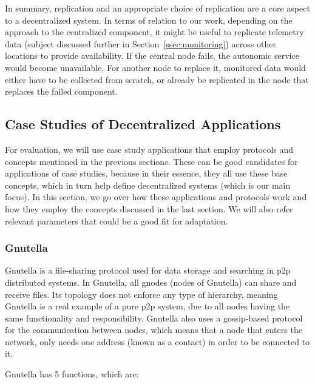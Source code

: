 \par In summary, replication and an appropriate choice of replication are a core aspect to a decentralized system. In terms of relation to our work, depending on the approach to the centralized component, it might be useful to replicate telemetry data (subject discussed further in Section~\ref{ssec:monitoring}) across other locations to provide availability. If the central node fails, the autonomic service would become unavailable. For another node to replace it, monitored data would either have to be collected from scratch, or already be replicated in the node that replaces the failed component.%
%
%
%
\subsection{Case Studies of Decentralized Applications}
\label{ssec:study_cases_of_decentralized_systems}
\par For evaluation, we will use case study applications that employ protocols and concepts mentioned in the previous sections. These can be good candidates for applications of case studies, because in their essence, they all use these base concepts, which in turn help define decentralized systems (which is our main focus). In this section, we go over how these applications and protocols work and how they employ the concepts discussed in the last section. We will also refer relevant parameters that could be a good fit for adaptation.
%
%
%
\subsubsection{Gnutella}
\label{sssec:gnutella}
\par Gnutella \cite{Bordignon2001} is a file-sharing protocol used for data storage and searching in \gls{p2p} distributed systems. In Gnutella, all gnodes (nodes of Gnutella) can share and receive files. Its topology does not enforce any type of hierarchy, meaning Gnutella is a real example of a pure \gls{p2p} system, due to all nodes having the same functionality and responsibility. Gnutella also uses a gossip-based protocol for the communication between nodes, which means that a node that enters the network, only needs one address (known as a contact) in order to be connected to it.
\par Gnutella has 5 functions, which are:
